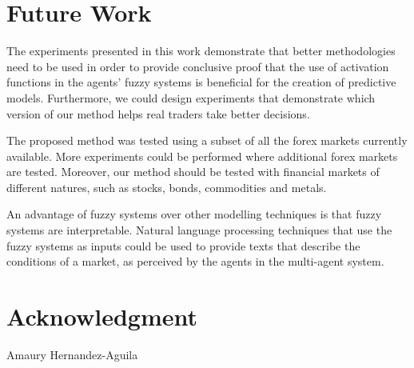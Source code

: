 \documentclass{ieeeaccess}
\begin{document}
\section{Future Work}
\label{section:future-work}

The experiments presented in this work demonstrate that better
methodologies need to be used in order to provide conclusive proof
that the use of activation functions in the agents' fuzzy systems is
beneficial for the creation of predictive models. Furthermore, we
could design experiments that demonstrate which version of our method
helps real traders take better decisions.

The proposed method was tested using a subset of all the forex markets
currently available. More experiments could be performed where
additional forex markets are tested. Moreover, our method should be
tested with financial markets of different natures, such as stocks,
bonds, commodities and metals.

An advantage of fuzzy systems over other modelling techniques is that
fuzzy systems are interpretable. Natural language processing
techniques that use the fuzzy systems as inputs could be used to
provide texts that describe the conditions of a market, as perceived
by the agents in the multi-agent system.




\section*{Acknowledgment}

\begin{IEEEbiography}{Amaury
  Hernandez-Aguila} 
\end{IEEEbiography}




\EOD
\end{document}
